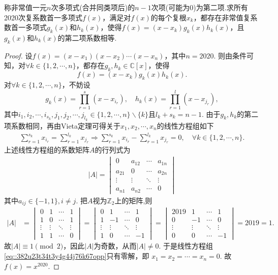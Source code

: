 \documentclass[../../main.tex]{subfiles}%
\begin{document}
\begin{example}
称非常值一元$n$次多项式(合并同类项后)的$n-1$次项(可能为0)为第二项.求所有2020次复系数首一多项式$f(x)$，满足对$f(x)$的每个复根$x_k$，都存在非常值复系数首一多项式$g_k(x)$和$h_k(x)$，使得$f(x)=(x - x_k)g_k(x)h_k(x)$，且$g_k(x)$和$h_k(x)$的第二项系数相等.
\end{example}
\begin{proof}
设$f(x)=(x-x_1)(x-x_2)\cdots(x-x_n)$，其中$n=2020$. 则由条件可知，对$\forall k\in\{1,2,\cdots,n\}$，都存在$g_k,h_k\in\mathbb{C}[x]$，使得
$$f(x)=(x-x_k)g_k(x)h_k(x).$$
对$\forall k\in\{1,2,\cdots,n\}$，不妨设
$$g_k(x)=\prod_{r=1}^s(x-x_{i_r}),\quad h_k(x)=\prod_{r=1}^l(x-x_{j_r}),$$
其中$i_1,i_2,\cdots,i_{s_k},j_1,j_2,\cdots,j_{l_k}\in\{1,2,\cdots,n\}\backslash\{k\}$且$l_k+s_k=n-1$.
由于$g_k,h_k$的第二项系数相同，再由Vieta定理可得关于$x_1,x_2,\cdots,x_n$的线性方程组如下
\begin{align}
\sum_{r=1}^{s_k}x_{i_r}=\sum_{r=1}^{l_k}x_{j_r}\Longrightarrow\sum_{r=1}^{s_k}x_{i_r}-\sum_{r=1}^{l_k}x_{j_r}=0,\quad\forall k\in\{1,2,\cdots,n\}.\label{eq::382u23t34t3y4g44j76k67opp}
\end{align}
上述线性方程组的系数矩阵$A$的行列式为
\begin{align*}
|A|=\begin{vmatrix}
0&a_{12}&\cdots&a_{1n}\\
a_{21}&0&\cdots&a_{2n}\\
\vdots&\vdots&\ddots&\vdots\\
a_{n1}&a_{n2}&\cdots&0
\end{vmatrix}
\end{align*}
其中$a_{ij}\in\{-1,1\},i\ne j$. 把$A$视为$\mathbb{Z}_2$上的矩阵,则
\begin{align*}
|A|&=\begin{vmatrix}
0&1&\cdots&1\\
1&0&\cdots&1\\
\vdots&\vdots&\ddots&\vdots\\
1&1&\cdots&0
\end{vmatrix}=\begin{vmatrix}
0&1&\cdots&1\\
1&-1&\cdots&0\\
\vdots&\vdots&\ddots&\vdots\\
1&0&\cdots&-1
\end{vmatrix}=\begin{vmatrix}
2019&1&\cdots&1\\
0&-1&\cdots&0\\
\vdots&\vdots&\ddots&\vdots\\
0&0&\cdots&-1
\end{vmatrix}=2019=1.
\end{align*}
故$|A|\equiv1\pmod{2}$，因此$|A|$为奇数，从而$|A|\ne0$. 于是线性方程组\eqref{eq::382u23t34t3y4g44j76k67opp}只有零解，即
$x_1=x_2=\cdots=x_n=0$.
故$f(x)=x^{2020}$.
\end{proof}
\end{document}
